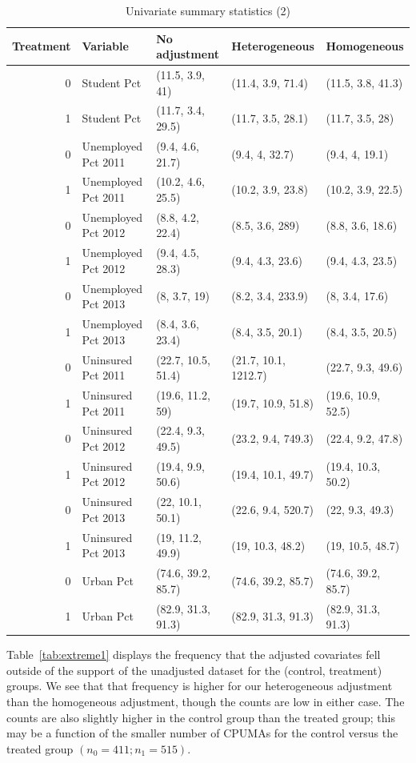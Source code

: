 \begin{table}[ht]
\centering
    \caption{Univariate summary statistics (2)}
    \label{tab:summarytab2}
\begin{tabular}{rllll}
  \hline
Treatment & Variable & No adjustment & Heterogeneous & Homogeneous \\ 
  \hline
  0 & Student Pct & (11.5, 3.9, 41) & (11.4, 3.9, 71.4) & (11.5, 3.8, 41.3) \\ 
  1 & Student Pct & (11.7, 3.4, 29.5) & (11.7, 3.5, 28.1) & (11.7, 3.5, 28) \\ 
  0 & Unemployed Pct 2011 & (9.4, 4.6, 21.7) & (9.4, 4, 32.7) & (9.4, 4, 19.1) \\ 
  1 & Unemployed Pct 2011 & (10.2, 4.6, 25.5) & (10.2, 3.9, 23.8) & (10.2, 3.9, 22.5) \\ 
  0 & Unemployed Pct 2012 & (8.8, 4.2, 22.4) & (8.5, 3.6, 289) & (8.8, 3.6, 18.6) \\ 
  1 & Unemployed Pct 2012 & (9.4, 4.5, 28.3) & (9.4, 4.3, 23.6) & (9.4, 4.3, 23.5) \\ 
  0 & Unemployed Pct 2013 & (8, 3.7, 19) & (8.2, 3.4, 233.9) & (8, 3.4, 17.6) \\ 
  1 & Unemployed Pct 2013 & (8.4, 3.6, 23.4) & (8.4, 3.5, 20.1) & (8.4, 3.5, 20.5) \\ 
  0 & Uninsured Pct 2011 & (22.7, 10.5, 51.4) & (21.7, 10.1, 1212.7) & (22.7, 9.3, 49.6) \\ 
  1 & Uninsured Pct 2011 & (19.6, 11.2, 59) & (19.7, 10.9, 51.8) & (19.6, 10.9, 52.5) \\ 
  0 & Uninsured Pct 2012 & (22.4, 9.3, 49.5) & (23.2, 9.4, 749.3) & (22.4, 9.2, 47.8) \\ 
  1 & Uninsured Pct 2012 & (19.4, 9.9, 50.6) & (19.4, 10.1, 49.7) & (19.4, 10.3, 50.2) \\ 
  0 & Uninsured Pct 2013 & (22, 10.1, 50.1) & (22.6, 9.4, 520.7) & (22, 9.3, 49.3) \\ 
  1 & Uninsured Pct 2013 & (19, 11.2, 49.9) & (19, 10.3, 48.2) & (19, 10.5, 48.7) \\ 
  0 & Urban Pct & (74.6, 39.2, 85.7) & (74.6, 39.2, 85.7) & (74.6, 39.2, 85.7) \\ 
  1 & Urban Pct & (82.9, 31.3, 91.3) & (82.9, 31.3, 91.3) & (82.9, 31.3, 91.3) \\ 
  \hline
\end{tabular}
\end{table}

Table~\ref{tab:extreme1} displays the frequency that the adjusted covariates fell outside of the support of the unadjusted dataset for the (control, treatment) groups. We see that that frequency is higher for our heterogeneous adjustment than the homogeneous adjustment, though the counts are low in either case. The counts are also slightly higher in the control group than the treated group; this may be a function of the smaller number of CPUMAs for the control versus the treated group $(n_0 = 411; n_1 = 515)$. 

